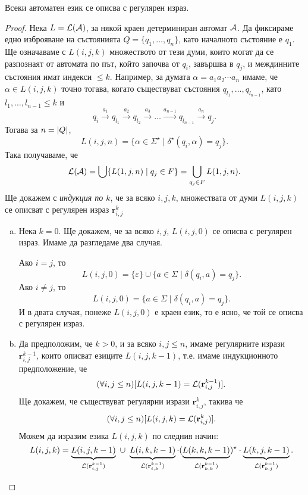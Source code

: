 \begin{framed}
\begin{thm}[Клини]
  \label{th:regular-kleene}
  Всеки автоматен език се описва с регулярен израз.
\end{thm}
\end{framed}
\begin{proof}
  Нека  $L = \mathcal{L}(\mathcal{A})$, за някой краен детерминиран автомат $\mathcal{A}$.
  Да фиксираме едно изброяване на състоянията $Q = \{q_1,\dots,q_n\}$,
  като началното състояние е $q_1$.
  Ще означаваме с $L(i,j,k)$ множеството от тези думи, които
  могат да се разпознаят от автомата по път, който започва от $q_i$,
  завършва в $q_j$, и междинните състояния имат индекси $\leq k$.
  Например, за думата $\alpha = a_1a_2\cdots a_n$ имаме, че $\alpha \in L(i,j,k)$
  точно тогава, когато съществуват състояния $q_{l_1},\dots,q_{l_{n-1}}$, като $l_1,\dots,l_{n-1} \leq k$ и
  \[q_i\stackrel{a_1}{\rightarrow} q_{l_1} \stackrel{a_2}{\rightarrow} q_{l_2} \stackrel{a_3}{\rightarrow} \dots \stackrel{a_{n-1}}{\rightarrow} q_{l_{n-1}}\stackrel{a_n}{\rightarrow} q_j.\]
  Тогава за $n = \lvert{Q}\rvert$, 
  \[L(i,j,n) = \{\alpha\in\Sigma^\star\mid \delta^\star(q_i,\alpha) = q_j\}.\]
  Така получаваме, че 
  \[\mathcal{L}(\mathcal{A}) = \bigcup\{L(1,j,n)\mid q_j \in F\} = \bigcup_{q_j\in F}L(1,j,n).\]
  Ще докажем с {\em индукция по $k$}, че за всяко $i,j,k$, множествата от думи $L(i,j,k)$
  се описват с регулярен израз $\mathbf{r}^k_{i,j}$
  \begin{enumerate}[a)]
  \item
    Нека $k = 0$. Ще докажем, че за всяко $i,j$, $L(i,j,0)$ се описва с регулярен израз.
    Имаме да разгледаме два случая.
    
    Ако $i = j$, то 
    \begin{equation}
      \label{eq:kleene-equal}
      L(i, j, 0) = \{\varepsilon\}\cup\{a\in\Sigma \mid \delta(q_i,a) = q_j\}.
    \end{equation}
    Ако $i \neq j$, то
    \[L(i, j, 0) = \{a\in\Sigma \mid \delta(q_i, a) = q_j\}.\]
    И в двата случая, понеже $L(i,j,0)$ е краен език, то е ясно, че той се описва с регулярен израз.
  \item
    Да предположим, че $k > 0$, и за всяко $i,j \leq n$, имаме регулярните изрази $\mathbf{r}^{k-1}_{i,j}$, които
    описват езиците $L(i,j,k-1)$, т.е. имаме индукционното предположение, че
    \[(\forall i,j \leq n)[L(i,j,k-1) = \mathcal{L}(\mathbf{r}^{k-1}_{i,j})].\] 
    Ще докажем, че съществуват регулярни изрази $\mathbf{r}^k_{i,j}$, такива че
    \[(\forall i,j \leq n)[L(i,j,k) = \mathcal{L}(\mathbf{r}^{k}_{i,j})].\] 
    Можем да изразим езика $L(i,j,k)$ по следния начин:
    \[L(i,j,k) = \underbrace{L(i,j,k-1)}_{\L(\mathbf{r}^{k-1}_{i,j})}\ \cup\ \underbrace{L(i,k,k-1)}_{\L(\mathbf{r}^{k-1}_{i,k})}\cdot (\underbrace{L(k,k,k-1)}_{\L(\mathbf{r}^{k-1}_{k,k})})^\star \cdot \underbrace{L(k,j,k-1)}_{\L(\mathbf{r}^{k-1}_{k,j})}.\]


\end{enumerate}
\end{proof}
